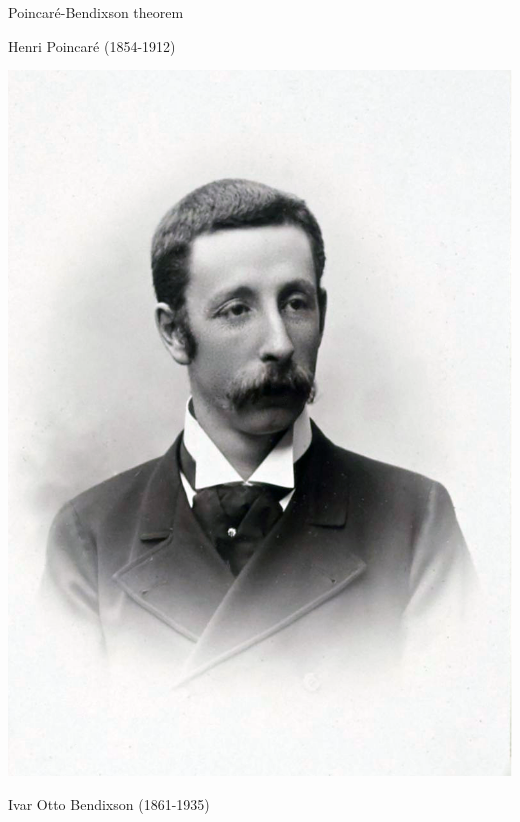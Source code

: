 \documentclass[usenames,dvipsnames,svgnames,10pt,aspectratio=169]{beamer}
\begin{document}
\begin{frame}[t, c]{Poincaré-Bendixson theorem}{}
\begin{minipage}{.48\textwidth}
    \small
    Henri Poincaré (1854-1912)
  \end{minipage}%
  \hfill
  \begin{minipage}{.48\textwidth}
    \centering
    \includegraphics[height=.5\textheight]{bendixson}

    \bigskip

    \small
    Ivar Otto Bendixson (1861-1935)
  \end{minipage}
\end{frame}
\end{document}
